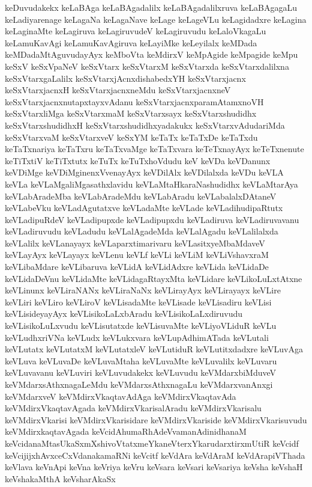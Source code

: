 {keDuvudakekx
keLaBAga
keLaBAgadalilx
keLaBAgadalilxruva
keLaBAgagaLu
keLadiyarenage
keLagaNa
keLagaNave
keLage
keLageVLu
keLagidadxre
keLagina
keLaginaMte
keLagiruva
keLagiruvudeV
keLagiruvudu
keLaloVkagaLu
keLamuKavAgi
keLamuKavAgiruva
keLayiMke
keLeyilalx
keMDada
keMDadaMtAguvudayAyx
keMboVta
keMdirxV
keMpAgide
keMpagide
keMpu
keSxV
keSxVpaNeV
keSxVtarx
keSxVtarxM
keSxVtarxda
keSxVtarxdalilxna
keSxVtarxgaLalilx
keSxVtarxjAcnxdishabedxYH
keSxVtarxjacnx
keSxVtarxjacnxH
keSxVtarxjacnxneMdu
keSxVtarxjacnxneV
keSxVtarxjacnxnutapxtayxvAdanu
keSxVtarxjacnxparamAtamxnoVH
keSxVtarxliMga
keSxVtarxmaM
keSxVtarxsayx
keSxVtarxshudidhx
keSxVtarxshudidhxH
keSxVtarxshudidhxyadakukx
keSxVtarxvAdudariMda
keSxVtarxvaM
keSxVtarxveV
keSxYM
keTaTx
keTaTxDe
keTaTxdu
keTaTxnariya
keTaTxru
keTaTxvaMge
keTaTxvara
keTeTxnayAyx
keTeTxnenute
keTiTxtiV
keTiTxtutx
keTuTx
keTuTxhoVdudu
keV
keVDa
keVDanunx
keVDiMge
keVDiMginenxVvenayAyx
keVDilAlx
keVDilalxda
keVDu
keVLA
keVLa
keVLaMgaliMgasathxlavidu
keVLaMtaHkaraNashudidhx
keVLaMtarAya
keVLabAradeMba
keVLabAradeMdu
keVLabAradu
keVLabalalxDAtaneV
keVLabeVku
keVLadAgutatxve
keVLadaMte
keVLade
keVLadihudipaRtutx
keVLadipuRdeV
keVLadipupxde
keVLadipupxdu
keVLadiruva
keVLadiruvavanu
keVLadiruvudu
keVLadudu
keVLalAgadeMda
keVLalAgadu
keVLalilalxda
keVLalilx
keVLanayayx
keVLaparxtimarivaru
keVLasitxyeMbaMdaveV
keVLayAyx
keVLayayx
keVLenu
keVLf
keVLi
keVLiM
keVLiVshavxraM
keVLibaMdare
keVLibaruva
keVLidA
keVLidAdxre
keVLida
keVLidaDe
keVLidaDeVnu
keVLidaMte
keVLidagaRtayxMta
keVLidare
keVLikoLuLxtAtxne
keVLinunx
keVLiraNANx
keVLiraNaNx
keVLirayAyx
keVLirayayx
keVLire
keVLiri
keVLiro
keVLiroV
keVLisadaMte
keVLisade
keVLisadiru
keVLisi
keVLisideyayAyx
keVLisikoLaLxbAradu
keVLisikoLaLxdiruvudu
keVLisikoLuLxvudu
keVLisutatxde
keVLisuvaMte
keVLiyoVLiduR
keVLu
keVLudhxriVNa
keVLudx
keVLukxvara
keVLupAdhimATada
keVLutali
keVLutatx
keVLutatxM
keVLutatxleV
keVLutiduR
keVLutitxdadxre
keVLuvAga
keVLuva
keVLuvaDe
keVLuvaMtaha
keVLuvaMte
keVLuvalilx
keVLuvaru
keVLuvavanu
keVLuviri
keVLuvudakekx
keVLuvudu
keVMdarxbiMduveV
keVMdarxsAthxnagaLeMdu
keVMdarxsAthxnagaLu
keVMdarxvanAnxgi
keVMdarxveV
keVMdirxVkaqtavAdAga
keVMdirxVkaqtavAda
keVMdirxVkaqtavAgada
keVMdirxVkarisalAradu
keVMdirxVkarisalu
keVMdirxVkarisi
keVMdirxVkarisidare
keVMdirxVkariside
keVMdirxVkarisuvudu
keVMdirxkaqtavAgada
keVcidAhumaRhAdeVvamanAdinidhanaM
keVcidanaMtasUkaSxmXshivoVtatxmeYkaneVterxYkarudarxtirxmUtiR
keVcidf
keVcijijxhAvxceCxVdanakamaRNi
keVcitf
keVdAra
keVdAraM
keVdArapiVThada
keVlava
keVnApi
keVna
keVriya
keVru
keVsara
keVsari
keVsariya
keVsha
keVshaH
keVshakaMthA
keVsharAkaSx
}
